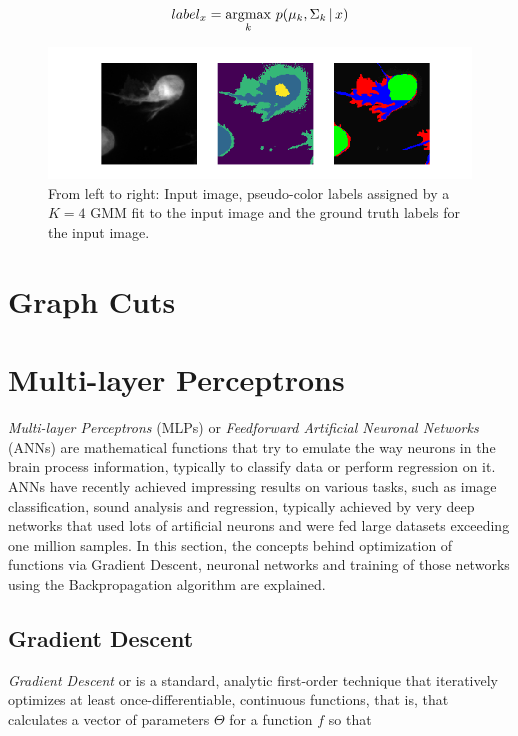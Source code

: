 \[ label_x = \operatorname*{\arg\!\max} \limits_{k} \, p(\mu_k, \Sigma_k\, | \, x) \]

\begin {figure}[!ht]
	\includegraphics{img/fig_gmm_vs_gt}
	\caption{From left to right: Input image, pseudo-color labels assigned by a $K=4$ GMM fit to the input image and the ground truth labels for the input image.}
	\label{fig:gmm_vs_gt}
\end {figure}


	\section{Graph Cuts}



	\section{Multi-layer Perceptrons}
\textit{Multi-layer Perceptrons} (MLPs) or \textit{Feedforward Artificial Neuronal Networks} (ANNs) are mathematical functions that try to emulate the way neurons in the brain process information, typically to classify data or perform regression on it. ANNs have recently achieved impressing results on various tasks, such as image classification, sound analysis and regression, typically achieved by very deep networks that used lots of artificial neurons and were fed large datasets exceeding one million samples. In this section, the concepts behind optimization of functions via Gradient Descent, neuronal networks and training of those networks using the Backpropagation algorithm are explained. 



	\subsection {Gradient Descent}
\label{subsec:grad_desc}

\textit{Gradient Descent} or is a standard, analytic first-order technique that iteratively optimizes at least once-differentiable, continuous functions, that is, that calculates a vector of parameters $\Theta$ for a function $f$ so that

